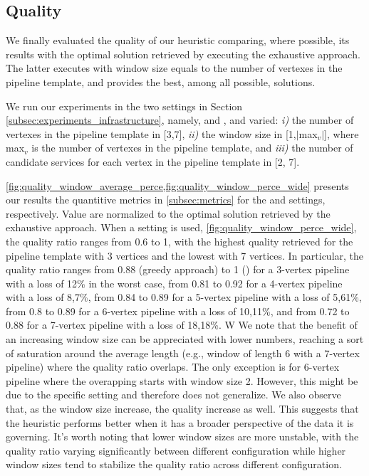 \subsection{Quality}\label{subsec:experiments_quality}
We finally evaluated the quality of our heuristic comparing, where possible, its results with the optimal solution retrieved by executing the exhaustive approach. The latter executes with window size equals to the number of vertexes in the pipeline template, and provides the best, among all possible, solutions.

We run our experiments in the two settings in Section \cref{subsec:experiments_infrastructure}, namely, \average and \wide,  and varied: \emph{i)} the number of vertexes in the pipeline template in [3,7], \emph{ii)} the window size in [1,$|$max$_v$$|$], where max$_v$ is the number of vertexes in the pipeline template, and \emph{iii)} the number of candidate services for each vertex in the pipeline template in [2, 7].

\cref{fig:quality_window_average_perce,fig:quality_window_perce_wide} presents our results the quantitive metrics in \cref{subsec:metrics} for the \wide and \average settings, respectively.
Value are normalized to the optimal solution retrieved by the exhaustive approach.
%
When a \wide setting is used, \cref{fig:quality_window_perce_wide}, the quality ratio ranges from 0.6 to 1, with the highest quality retrieved for the pipeline template with 3 vertices and the lowest with 7 vertices.
%
In particular, the quality ratio ranges from 0.88 (greedy approach) to 1 () for a 3-vertex pipeline with a loss of 12\% in the worst case, from 0.81 to 0.92 for a 4-vertex pipeline with a loss of 8,7\%, from 0.84 to 0.89 for a 5-vertex pipeline with a loss of 5,61\%, from 0.8 to 0.89 for a 6-vertex pipeline with a loss of 10,11\%, and from 0.72 to 0.88 for a 7-vertex pipeline with a loss of 18,18\%. W
%
We note that the benefit of an increasing window size can be appreciated with lower numbers, reaching a sort of saturation around the average length (e.g., window of length 6 with a 7-vertex pipeline) where the quality ratio overlaps. The only exception is for 6-vertex pipeline where the overapping starts with window size 2. However, this might be due to the specific setting and therefore does not generalize.
We also observe that, as the window size increase, the quality increase as well. This suggests that the heuristic performs better when it has a broader perspective of the data it is governing.
It's worth noting that lower window sizes are more unstable, with the quality ratio varying significantly between different configuration while higher window sizes tend to stabilize the quality ratio across different configuration.

